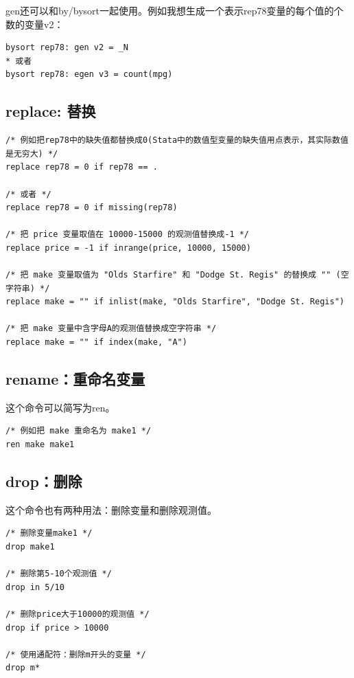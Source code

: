\documentclass[]{ctexbook}
\begin{document}
gen还可以和by/bysort一起使用。例如我想生成一个表示rep78变量的每个值的个数的变量v2：

\begin{lstlisting}
bysort rep78: gen v2 = _N
* 或者
bysort rep78: egen v3 = count(mpg)
\end{lstlisting}

\hypertarget{replace-}{%
\subsection{replace: 替换}\label{replace-}}

\begin{lstlisting}
/* 例如把rep78中的缺失值都替换成0(Stata中的数值型变量的缺失值用点表示，其实际数值是无穷大) */
replace rep78 = 0 if rep78 == .

/* 或者 */
replace rep78 = 0 if missing(rep78)

/* 把 price 变量取值在 10000-15000 的观测值替换成-1 */
replace price = -1 if inrange(price, 10000, 15000)

/* 把 make 变量取值为 "Olds Starfire" 和 "Dodge St. Regis" 的替换成 "" (空字符串) */
replace make = "" if inlist(make, "Olds Starfire", "Dodge St. Regis")

/* 把 make 变量中含字母A的观测值替换成空字符串 */
replace make = "" if index(make, "A")
\end{lstlisting}

\hypertarget{rename}{%
\subsection{rename：重命名变量}\label{rename}}

这个命令可以简写为ren。

\begin{lstlisting}
/* 例如把 make 重命名为 make1 */
ren make make1
\end{lstlisting}

\hypertarget{drop}{%
\subsection{drop：删除}\label{drop}}

这个命令也有两种用法：删除变量和删除观测值。

\begin{lstlisting}
/* 删除变量make1 */
drop make1

/* 删除第5-10个观测值 */
drop in 5/10

/* 删除price大于10000的观测值 */
drop if price > 10000

/* 使用通配符：删除m开头的变量 */
drop m*
\end{lstlisting}
\end{document}
